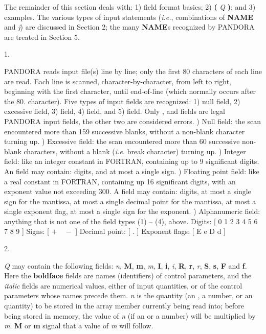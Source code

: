 The remainder of this section deals with: 
1) field format basics; 2) {\bf (} {\it Q} {\bf)}; and 3) examples.
The various types of input statements ({\it i.e.}, combinations of
{\bf NAME} and {\it j}) are  discussed in Section 2; the many {\bf NAME}s
recognized by \break PANDORA are treated in Section 5.
\ej
\centerline{1. }
\blankline
\blankline
PANDORA reads input file(s) line by line; only the first 80 characters
of each line are read. Each line is scanned, character-by-character,
from left to right, beginning with the first character, until end-of-line
(which normally occurs after the 80. character). Five types of input
fields are recognized: 1) null field, 2) excessive field, 3) {\intg} field,
4) {\flpt} field, and 5) {\alfa} field. Only {\intg}, {\flpt} and {\alfa}
fields are legal PANDORA input fields, the other two are considered
errors.
) Null field: the scan encountered more than 159 successive blanks,
without a non-blank character turning up.
) Excessive field: the scan encountered more than 60 successive
non-blank characters, without a blank ({\it i.e.} break character)
turning up.
) Integer field: like an integer constant in FORTRAN, containing up
to 9 significant digits. An {\intg} field may contain: digits,
and at most a single sign.
) Floating point field: like a real constant in FORTRAN, containing up
16 significant digits, with an exponent value not exceeding 300.
A {\flpt} field may contain: digits, at most a single sign for the 
mantissa, at most a single decimal point for the mantissa,
at most a single exponent flag, at most a single sign for the exponent.
) Alphanumeric field: anything that is not one of the field types
(1) -- (4), above.
\blankline
Digits: [ 0 1 2 3 4 5 6 7 8 9 ]
\blankline
Signs: [ $+ \quad -$ ]
\blankline
Decimal point: [ . ]
\blankline
Exponent flags: [ E e D d ]
\ej
\centerline{2. }
\blankline
\blankline
{\it Q} may contain the following fields: {\it n}, {\bf M}, {\bf m}, {\it m},
{\bf I}, {\bf i}, {\it i}, {\bf R}, {\bf r}, {\it r}, {\bf S}, {\bf s}, {\bf F}
and {\bf f}. Here the
{\bf boldface} fields are names (identifiers) of control parameters, and
the {\it italic} fields are numerical values, either of input
quantities, or of the control parameters whose names precede them.
\blankline
{\it n} is the quantity (an {\intg}, a {\flpt} number, or an {\alfa} quantity)
to be stored in the array member currently being read into; before
being stored in memory, the value of {\it n} (if an {\intg} or a {\flpt}
number) will be multiplied by {\it m}.
\blankline
{\bf M} or {\bf m} signal that a value of {\it m} will follow.

